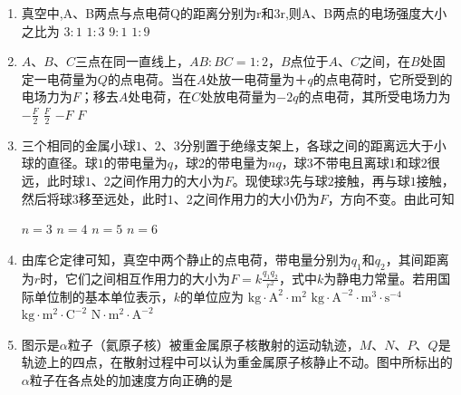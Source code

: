 

\begin{enumerate}[leftmargin=0em]
\renewcommand{\labelenumi}{\arabic{enumi}.}
\item
{}
真空中,A、B两点与点电荷Q的距离分别为r和3r,则A、B两点的电场强度大小之比为  
\fourchoices
{$ 3:1 $}
{$ 1:3 $}
{$ 9:1 $}
{$ 1:9 $}


\item
{}
$ A $、$ B $、$ C $三点在同一直线上，$ AB:BC=1:2 $，$ B $点位于$ A $、$ C $之间，在$ B $处固定一电荷量为$ Q $的点电荷。当在$ A $处放一电荷量为＋$ q $的点电荷时，它所受到的电场力为$ F $；移去$ A $处电荷，在$ C $处放电荷量为$ -2q $的点电荷，其所受电场力为  
\fourchoices
{$ -\frac{F}{2} $}
{$ \frac{F}{2} $}
{$ -F $}
{$ F $}


\item
{}
三个相同的金属小球$ 1 $、$ 2 $、$ 3 $分别置于绝缘支架上，各球之间的距离远大于小球的直径。球$ 1 $的带电量为$ q $，球$ 2 $的带电量为$ nq $，球$ 3 $不带电且离球$ 1 $和球$ 2 $很远，此时球$ 1 $、$ 2 $之间作用力的大小为$ F $。现使球$ 3 $先与球$ 2 $接触，再与球$ 1 $接触，然后将球$ 3 $移至远处，此时$ 1 $、$ 2 $之间作用力的大小仍为$ F $，方向不变。由此可知  

\fourchoices
{$ n=3 $}
{$ n=4 $}
{$ n=5 $}
{$ n=6 $}





\item
{}
由库仑定律可知，真空中两个静止的点电荷，带电量分别为$ q_{1} $和$ q_{2} $，其间距离为$ r $时，它们之间相互作用力的大小为$F = k \frac { q _ { 1 } q _ { 2 } } { r ^ { 2 } }$，式中$ k $为静电力常量。若用国际单位制的基本单位表示，$ k $的单位应为  
\fourchoices
{$\mathrm { kg } \cdot \mathrm { A } ^ { 2 } \cdot \mathrm { m } ^ { 2 }$}
{$\mathrm { kg } \cdot \mathrm { A } ^ { - 2 } \cdot \mathrm { m } ^ { 3 } \cdot \mathrm { s } ^ { - 4 }$}
{$\mathrm { kg } \cdot \mathrm { m } ^ { 2 } \cdot \mathrm { C } ^ { - 2 }$}
{$\mathrm { N } \cdot \mathrm { m } ^ { 2 } \cdot \mathrm { A } ^ { - 2 }$}





\item
{}
图示是$ \alpha $粒子（氦原子核）被重金属原子核散射的运动轨迹，$ M $、$ N $、$ P $、$ Q $是轨迹上的四点，在散射过程中可以认为重金属原子核静止不动。图中所标出的$ \alpha $粒子在各点处的加速度方向正确的是  
\begin{figure}[h!]
\centering

\end{figure}



\end{enumerate}
